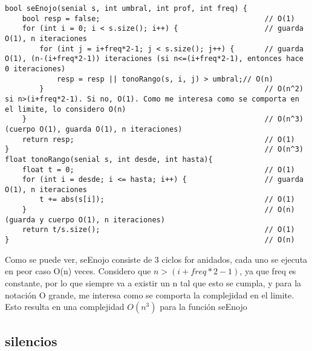 \documentclass{article}
\begin{document}
\begin{lstlisting}
bool seEnojo(senial s, int umbral, int prof, int freq) {
    bool resp = false;                                      // O(1)
    for (int i = 0; i < s.size(); i++) {                    // guarda O(1), n iteraciones
        for (int j = i+freq*2-1; j < s.size(); j++) {       // guarda O(1), (n-(i+freq*2-1)) iteraciones (si n<=(i+freq*2-1), entonces hace 0 iteraciones)
            resp = resp || tonoRango(s, i, j) > umbral;// O(n)
        }                                                   // O(n^2) si n>(i+freq*2-1). Si no, O(1). Como me interesa como se comporta en el limite, lo considero O(n)
    }                                                       // O(n^3) (cuerpo O(1), guarda O(1), n iteraciones)
    return resp;                                            // O(1)
}                                                           // O(n^3)
float tonoRango(senial s, int desde, int hasta){
    float t = 0;                                            // O(1)
    for (int i = desde; i <= hasta; i++) {                  // guarda O(1), n iteraciones
        t += abs(s[i]);                                     // O(1)
    }                                                       // O(n) (guarda y cuerpo O(1), n iteraciones)
    return t/s.size();                                      // O(1)
}                                                           // O(n)
\end{lstlisting}

Como se puede ver, seEnojo consiste de 3 ciclos for anidados, cada uno se ejecuta en peor caso O(n) veces.
Considero que $n>(i+freq*2-1)$, ya que freq es constante, por lo que siempre va a existir un n tal que esto se cumpla,
y para la notación O grande, me interesa como se comporta la complejidad en el limite.
Esto resulta en una complejidad $O(n^3)$ para la función seEnojo

\newpage
\subsection{silencios}
\end{document}

